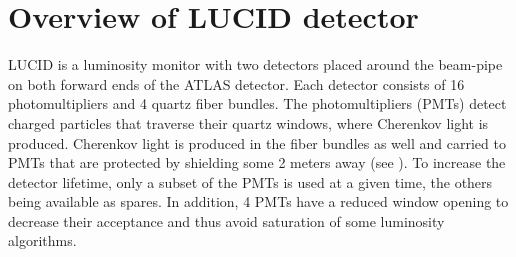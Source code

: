%    
%   
%  
% 

\section{Overview of LUCID detector}
\label{sec:LUCID}
LUCID is a luminosity monitor with two detectors placed around the beam-pipe on both forward ends of the ATLAS detector. 
Each detector consists of 16 photomultipliers and 4 quartz fiber bundles. The photomultipliers (PMTs) detect charged 
particles that traverse their quartz windows, where Cherenkov light is produced. Cherenkov light is produced in 
the fiber bundles as well and carried to PMTs that are protected by shielding some 2 meters away 
(see ). To increase the detector lifetime, only a subset of the PMTs is used at a 
given time, the others being available as spares. In addition, 4 PMTs have a reduced window opening to decrease 
their acceptance and thus avoid saturation of some luminosity algorithms.

